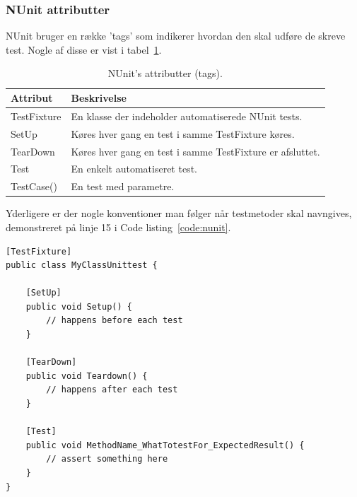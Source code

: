 \subsubsection{NUnit attributter}
NUnit bruger en række 'tags' som indikerer hvordan den skal udføre de skreve test. Nogle af disse er vist i tabel~\ref{tab:nunit}.

\begin{table}[H]
	\centering
	\begin{tabular}{ll}
		\toprule
		\rowcolor{Black!5} \textbf{Attribut}& 	\textbf{Beskrivelse}\\ \midrule
		TestFixture	&	En klasse der indeholder automatiserede NUnit tests. \\
		SetUp		&	Køres hver gang en test i samme TestFixture køres.\\
		TearDown	&	Køres hver gang en test i samme TestFixture er afsluttet.\\
		Test		&	En enkelt automatiseret test.\\
		TestCase()	&	En test med parametre.\\ \bottomrule
	\end{tabular}
	\caption{NUnit's attributter (tags).}
	\label{tab:nunit}
\end{table}

Yderligere er der nogle konventioner man følger når testmetoder skal navngives, demonstreret på linje 15 i Code listing~\ref{code:nunit}.

\begin{lstlisting}[caption=NUnit eksempel på Setup og Teardown.,label=code:nunit]
[TestFixture]
public class MyClassUnittest {

	[SetUp]
	public void Setup() {
		// happens before each test
	}
	
	[TearDown]
	public void Teardown() {
		// happens after each test
	}
	
	[Test]
	public void MethodName_WhatTotestFor_ExpectedResult() {
		// assert something here
	}
}
\end{lstlisting}


